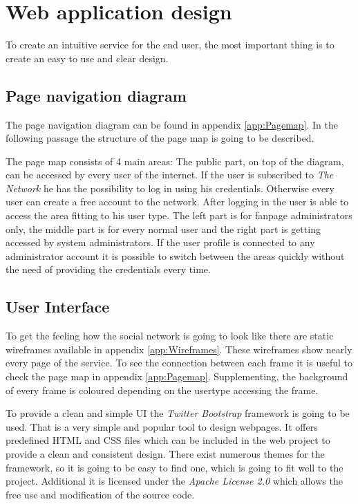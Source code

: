\documentclass[11pt,a4paper]{report}
\begin{document}
\section{Web application design}
To create an intuitive service for the end user, the most important thing is to create an easy to use and clear design.

\subsection{Page navigation diagram}
The page navigation diagram can be found in appendix \vref{app:Pagemap}. In the following passage the structure of the page map is going to be described.

The page map consists of 4 main areas: The public part, on top of the diagram, can be accessed by every user of the internet. If the user is subscribed to \emph{The Network} he has the possibility to log in using his credentials. Otherwise every user can create a free account to the network. After logging in the user is able to access the area fitting to his user type. The left part is for fanpage administrators only, the middle part is for every normal user and the right part is getting accessed by system administrators. If the user profile is connected to any administrator account it is possible to switch between the areas quickly without the need of providing the credentials every time.
\subsection{User Interface}
To get the feeling how the social network is going to look like there are static wireframes available in appendix \vref{app:Wireframes}. These wireframes show nearly every page of the service. To see the connection between each frame it is useful to check the page map in appendix \vref{app:Pagemap}. Supplementing, the background of every frame is coloured depending on the usertype accessing the frame.

To provide a clean and simple UI the \emph{Twitter Bootstrap} framework is going to be used. That is a very simple and popular tool to design webpages. It offers predefined HTML and CSS files which can be included in the web project to provide a clean and consistent design. There exist numerous themes for the framework, so it is going to be easy to find one, which is going to fit well to the project. Additional it is licensed under the \emph{Apache License 2.0} which allows the free use and modification of the source code. 
\end{document}
